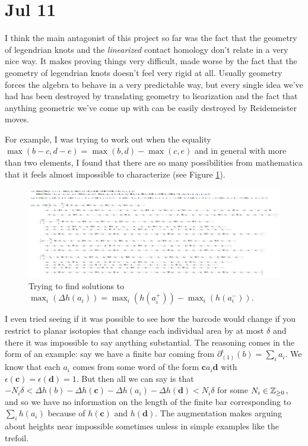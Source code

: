 \documentclass[11pt,oneside]{amsart}
\begin{document}
\section{Jul 11}

I think the main antagonist of this project so far was the fact that the geometry of legendrian knots and the \textit{linearized} contact homology don't relate in a very nice way. It makes proving things very difficult, made worse by the fact that the geometry of legendrian knots doesn't feel very rigid at all. Usually geometry forces the algebra to behave in a very predictable way, but every single idea we've had has been destroyed by translating geometry to liearization and the fact that anything geometric we've come up with can be easily destroyed by Reidemeister moves.

For example, I was trying to work out when the equality $\max(b-c,d-e)=\max(b,d)-\max(c,e)$ and in general with more than two elements, I found that there are so many possibilities from mathematica that it feels almost impossible to characterize (see Figure \ref{fig:mathematica}).

\begin{figure}
    \centering
    \includegraphics[width=\linewidth]{Journals/mathematicastuff.png}
    \caption{Trying to find solutions to $\max_i(\Delta h(a_i))=\max_i(h(a_i^+))-\max_i(h(a_i^-))$.}
    \label{fig:mathematica}
\end{figure}

I even tried seeing if it was possible to see how the barcode would change if you restrict to planar isotopies that change each individual area by at most $\delta$ and there it was impossible to say anything substantial. The reasoning comes in the form of an example: say we have a finite bar coming from $\partial^\epsilon_{(1)}(b)=\sum_i a_i$. We know that each $a_i$ comes from some word of the form $\mathbf{c}a_i\mathbf{d}$ with $\epsilon(\mathbf{c})=\epsilon(\mathbf{d})=1$. But then all we can say is that $-N_i\delta< \Delta h(b)-\Delta h(\mathbf{c})-
\Delta h(a_i)-\Delta h(\mathbf{d})<N_i\delta$ for some $N_i\in \mathbb Z_{\geq 0}$, and so we have no information on the length of the finite bar corresponding to $\sum_i h(a_i)$ because of $h(\mathbf{c})$ and $h(\mathbf{d})$. The augmentation makes arguing about heights near impossible sometimes unless in simple examples like the trefoil.
\end{document}
